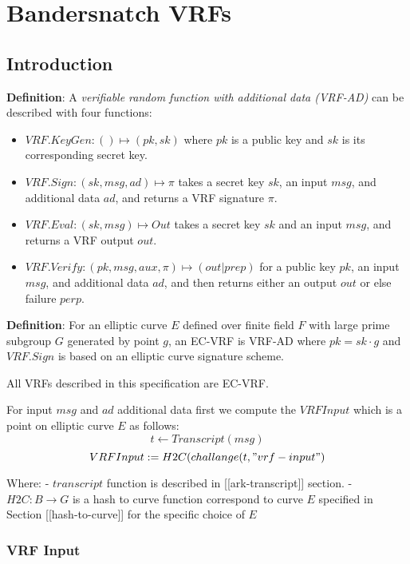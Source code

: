 \documentclass[
]{article}
\author{}
\date{}
\providecommand{\tightlist}{%
  \setlength{\itemsep}{0pt}\setlength{\parskip}{0pt}}
\begin{document}
\hypertarget{bandersnatch-vrfs}{%
\section{Bandersnatch VRFs}\label{bandersnatch-vrfs}}

\hypertarget{introduction}{%
\subsection{Introduction}\label{introduction}}

\textbf{Definition}: A \emph{verifiable random function with additional
data (VRF-AD)} can be described with four functions:

\begin{itemize}
\tightlist
\item
  \(VRF.KeyGen: () \mapsto (pk,sk)\) where \(pk\) is a public key and
  \(sk\) is its corresponding secret key.
\item
  \(VRF.Sign : (sk,msg,ad) \mapsto \pi\) takes a secret key \(sk\), an
  input \(msg\), and additional data \(ad\), and returns a VRF signature
  \(\pi\).
\item
  \(VRF.Eval : (sk, msg) \mapsto Out\) takes a secret key \(sk\) and an
  input \(msg\), and returns a VRF output \(out\).
\item
  \(VRF.Verify: (pk,msg,aux,\pi) \mapsto (out|prep)\) for a public key
  \(pk\), an input \(msg\), and additional data \(ad\), and then returns
  either an output \(out\) or else failure \(perp\).
\end{itemize}

\textbf{Definition}: For an elliptic curve \(E\) defined over finite
field \(F\) with large prime subgroup \(G\) generated by point \(g\), an
EC-VRF is VRF-AD where \(pk = sk \cdot g\) and \(VRF.Sign\) is based on
an elliptic curve signature scheme.

All VRFs described in this specification are EC-VRF.

For input \(msg\) and \(ad\) additional data first we compute the
\(VRFInput\) which is a point on elliptic curve \(E\) as follows:
\[ t \leftarrow Transcript(msg) \]
\[ VRFInput := H2C(challange(t, "vrf-input") \]

Where: - \(transcript\) function is described in
{[}{[}ark-transcript{]}{]} section. - \(H2C: B \rightarrow G\) is a hash
to curve function correspond to curve \(E\) specified in Section
{[}{[}hash-to-curve{]}{]} for the specific choice of \(E\)

\hypertarget{vrf-input}{%
\subsubsection{VRF Input}\label{vrf-input}}
\end{document}
